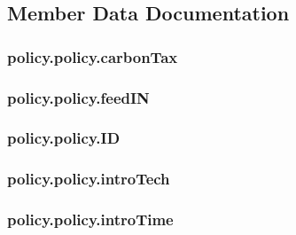 \subsection{Member Data Documentation}
\hypertarget{classpolicy_1_1policy_ab5274974d3f8e6b19c6c5a23f04f9b69}{
\subsubsection[{carbon\-Tax}]{\setlength{\rightskip}{0pt plus 5cm}policy.\-policy.\-carbon\-Tax}}\label{classpolicy_1_1policy_ab5274974d3f8e6b19c6c5a23f04f9b69}
\hypertarget{classpolicy_1_1policy_ad7ccbdc8d842ac638045db7389eadf94}{
\subsubsection[{feed\-I\-N}]{\setlength{\rightskip}{0pt plus 5cm}policy.\-policy.\-feed\-I\-N}}\label{classpolicy_1_1policy_ad7ccbdc8d842ac638045db7389eadf94}
\hypertarget{classpolicy_1_1policy_a9db0590c5c9ede972a38a4a5be0be707}{
\subsubsection[{I\-D}]{\setlength{\rightskip}{0pt plus 5cm}policy.\-policy.\-I\-D}}\label{classpolicy_1_1policy_a9db0590c5c9ede972a38a4a5be0be707}
\hypertarget{classpolicy_1_1policy_af6b257b9fdd301fd9b64b356f30225de}{
\subsubsection[{intro\-Tech}]{\setlength{\rightskip}{0pt plus 5cm}policy.\-policy.\-intro\-Tech}}\label{classpolicy_1_1policy_af6b257b9fdd301fd9b64b356f30225de}
\hypertarget{classpolicy_1_1policy_a7f55cb2613c6314c33db2e968696a571}{
\subsubsection[{intro\-Time}]{\setlength{\rightskip}{0pt plus 5cm}policy.\-policy.\-intro\-Time}}\label{classpolicy_1_1policy_a7f55cb2613c6314c33db2e968696a571}
